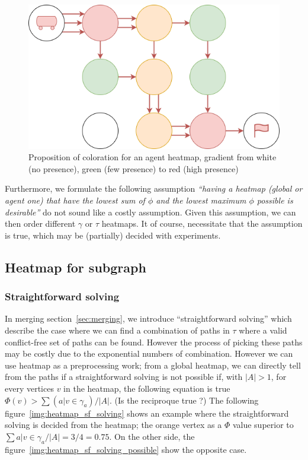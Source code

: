 \begin{figure}[H]
  \centering
  \caption{Proposition of coloration for an agent heatmap, gradient from white (no presence), green (few presence) to red (high presence)}\label{img:colored_heatmap}
  \includegraphics[width=\widthimg]{img/colored_heatmap.drawio.png}
\end{figure}

Furthermore, we formulate the following assumption \textit{``having a heatmap (global or agent one) that have the lowest sum of \(\phi\) and the lowest maximum \(\phi\) possible is desirable''} do not sound like a costly assumption. Given this assumption, we can then order different \(\gamma\) or \(\tau\) heatmaps. It of course, necessitate that the assumption is true, which may be (partially) decided with experiments.   


\subsection{Heatmap for subgraph}

\subsubsection{Straightforward solving}

In merging section~\ref{sec:merging}, we introduce ``straightforward solving'' which describe the case where we can find a combination of paths in \(\tau\) where a valid conflict-free set of paths can be found. However the process of picking these paths may be costly due to the exponential numbers of combination. However we can use heatmap as a preprocessing work; from a global heatmap, we can directly tell from the paths if a straightforward solving is not possible if, with \(|A| > 1\), for every vertices \(v\) in the heatmap, the following equation is true \( \Phi(v) > \sum{(a | v \in \gamma_a)} / |A|\). (Is the reciproque true ?) The following figure~\ref{img:heatmap_sf_solving} shows an example where the straightforward solving is decided from the heatmap; the orange vertex as a \(\Phi\) value superior to \(\sum{a | v \in \gamma_a} / |A| = 3/4 = 0.75\). On the other side, the figure~\ref{img:heatmap_sf_solving_possible} show the opposite case.

